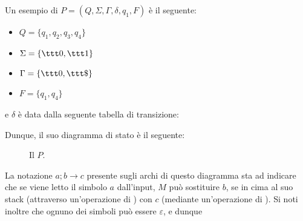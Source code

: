 \documentclass[a4paper, 12pt]{report}
\begin{document}
    \begin{example}[\PDA]
        \label{pda ex}
        Un esempio di \PDA $P = (Q, \Sigma, \Gamma, \delta, q_1, F)$ è il seguente:

        \begin{itemize}
            \item $Q = \{q_1, q_2, q_3, q_4\}$
            \item $\Sigma = \{ \ttt 0, \ttt 1 \}$
            \item $\Gamma = \{ \ttt 0, \ttt \$\}$
            \item $F = \{ q_1, q_4 \}$
        \end{itemize}

        e $\delta$ è data dalla seguente tabella di transizione:


        Dunque, il suo diagramma di stato è il seguente:

        \begin{figure}[H]
            \centering
             \caption{Il \PDA $P$.}
        \end{figure}

        La notazione $a; b \to c$ presente sugli archi di questo diagramma sta ad indicare che se viene letto il simbolo $a$ dall'input, $M$ può sostituire $b$, se in cima al suo stack (attraverso un'operazione di ) con $c$ (mediante un'operazione di ). Si noti inoltre che ognuno dei simboli può essere $\varepsilon$, e dunque


\end{example}
\end{document}
